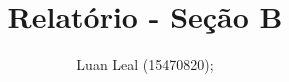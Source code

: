 \documentclass{article}
\author{Luan Leal (15470820); }
\title{Relatório - Seção B}
\begin{document}
\maketitle


    \begin{multicols}{2}

    
    
    
    
    

    

    \end{multicols}
    
\end{document}
